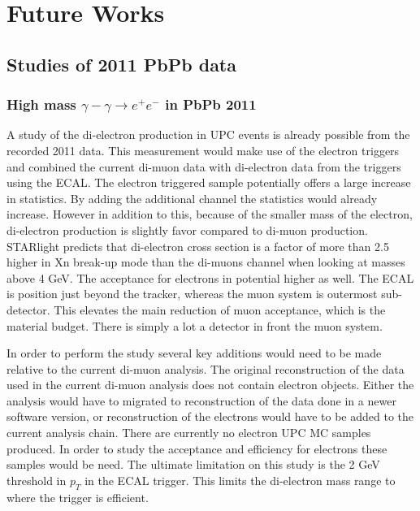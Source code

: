 \chapter{Future Works}  
  \section{Studies of 2011 PbPb data}

    \subsection{High mass $\gamma-\gamma \rightarrow e^{+} e^{-}$  in PbPb 2011}
      A study of the di-electron production in UPC events is already possible 
  from the recorded 2011 data. 
      This measurement would make use of the electron triggers and combined the 
  current di-muon data with di-electron data from the triggers using the
  ECAL. 
      The electron triggered sample potentially offers a large increase in 
  statistics. 
      By adding the additional channel the statistics would already increase.
      However in addition to this, because of the smaller mass of the electron,
  di-electron production is slightly favor compared to di-muon 
  production.
      STARlight predicts that di-electron cross section is a factor of more than 
  2.5 higher in Xn break-up mode than the di-muons channel when looking 
  at masses above 4 GeV.
      The acceptance for electrons in potential higher as well. 
      The ECAL is position just beyond the tracker, whereas the muon system is 
  outermost sub-detector. 
      This elevates the main reduction of muon acceptance, which is the material
  budget. 
      There is simply a lot a detector in front the muon system.

      In order to perform the study several key additions would need to be made
  relative to the current di-muon analysis. 
      The original reconstruction of the data used in the current di-muon 
  analysis does not contain electron objects. 
      Either the analysis would have to migrated to reconstruction of the data
  done in a newer software version, or reconstruction of the electrons 
  would have to be added to the current analysis chain. 
      There are currently no electron UPC MC samples produced. 
      In order to study the acceptance and efficiency for electrons these samples
  would be need. 
      The ultimate limitation on this study is the 2 GeV threshold in $p_{T}$ in
  the ECAL trigger. 
      This limits the di-electron mass range to where the trigger is efficient. 

